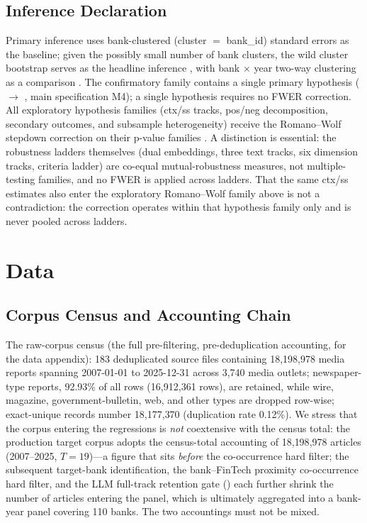 \subsection{Inference Declaration}\label{sec:method:infer}
Primary inference uses bank-clustered (cluster $=$ bank\_id) standard
errors as the baseline; given the possibly small number of bank
clusters, the wild cluster bootstrap serves as the headline inference
\parencite{roodman2019boottest,mackinnon2017wild,cameron2008bootstrap},
with bank $\times$ year two-way clustering as a comparison
\parencite{cameron2015practitioner}. The confirmatory family contains
a single primary hypothesis ( $\to$
, main specification M4); a single hypothesis requires no
FWER correction. All exploratory hypothesis families (ctx/ss tracks,
pos/neg decomposition, secondary outcomes,  and
subsample heterogeneity) receive the Romano--Wolf stepdown correction
on their p-value families \parencite{romano2005stepwise}. A
distinction is essential: the robustness ladders themselves (dual
embeddings, three text tracks, six dimension tracks, criteria ladder)
are co-equal mutual-robustness measures, not multiple-testing families,
and no FWER is applied across ladders. That the same ctx/ss estimates
also enter the exploratory Romano--Wolf family above is not a
contradiction: the correction operates within that hypothesis family
only and is never pooled across ladders.

\section{Data}\label{sec:data}

\subsection{Corpus Census and Accounting Chain}
The raw-corpus census (the full pre-filtering, pre-deduplication
accounting, for the data appendix): 183 deduplicated source files
containing 18{,}198{,}978 media reports spanning 2007-01-01 to
2025-12-31 across 3{,}740 media outlets; newspaper-type reports,
92.93\% of all rows (16{,}912{,}361 rows), are retained, while wire,
magazine, government-bulletin, web, and other types are dropped
row-wise; exact-unique records number 18{,}177{,}370 (duplication rate
0.12\%). We stress that the corpus entering the regressions is
\emph{not} coextensive with the census total: the production target
corpus adopts the census-total accounting of 18{,}198{,}978 articles
(2007--2025, $T=19$)---a figure that sits \emph{before} the
co-occurrence hard filter; the subsequent target-bank identification, the
bank--FinTech proximity co-occurrence hard filter, and the LLM
full-track retention gate () each further
shrink the number of articles entering the panel, which is ultimately
aggregated into a bank-year panel covering 110 banks.
 The two accountings must not be mixed.

